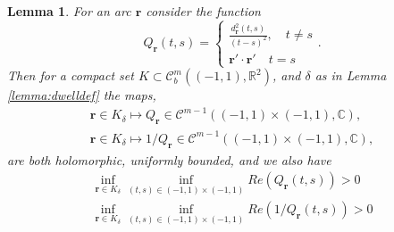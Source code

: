 \documentclass{article}
\newtheorem{lemma}[theorem]{Lemma}
\newcommand{\IC}{{\mathbb C}}
\newcommand{\IR}{{\mathbb R}}
\newcommand{\cmspace}[3]{\mathcal{C}^{#1} \left( #2, #3 \right)}
\newcommand{\rgeo}[1]{\mathcal{C}_b^{#1}\left( (-1,1), \IR^2 \right)}
\newcommand{\br}{\bm{r}}
\begin{document}
\begin{lemma}
\label{lemma:Qfun}
For an arc $\br$ consider the function 
$$
Q_{\br}(t,s) = \begin{cases}
\frac{d^2_{\br}(t,s)}{(t-s)^2}, \quad t\neq s \\
\br ' \cdot \br ' \quad t =s 
\end{cases}.
$$
Then for a compact set $K \subset \rgeo{m}$, and $\delta$ as in Lemma \ref{lemma:dwelldef} the maps, 
\begin{align*}
\br \in K_\delta \mapsto Q_{\br} \in \cmspace{m-1}{(-1,1)\times(-1,1)}{\IC}, \\
\br \in K_\delta \mapsto 1/Q_{\br} \in \cmspace{m-1}{(-1,1)\times(-1,1)}{\IC}, 
\end{align*} 
are both holomorphic, uniformly bounded, and we also have  
\begin{align*}
\inf_{\br \in K_\delta} \inf_{(t,s) \in (-1,1)\times (-1,1)} Re(Q_{\br}(t,s)) >0 \\
\inf_{\br \in K_\delta} \inf_{(t,s) \in (-1,1)\times (-1,1)} Re(1/Q_{\br}(t,s)) >0 
\end{align*}
\end{lemma}
\end{document}
